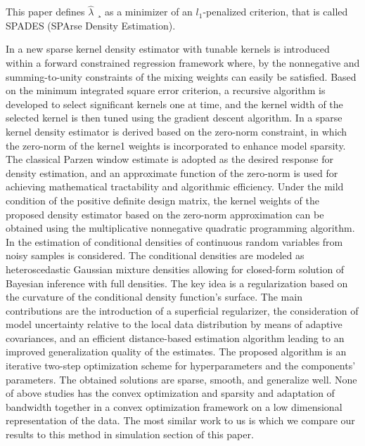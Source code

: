 This paper defines  $\hat{\lambda}$  ¸ as a minimizer of an $l_1$-penalized criterion, that is called SPADES (SPArse Density Estimation). \par
In \cite{hong2016sparse} a new sparse kernel density estimator with tunable kernels is introduced within a forward constrained regression framework where, by the nonnegative and summing-to-unity constraints of the mixing weights can easily be satisfied. Based on the minimum integrated square error criterion, a recursive algorithm is developed to select significant kernels one at time, and the kernel width of the selected kernel is then tuned using the gradient descent algorithm. In \cite{hong2010sparse} a sparse kernel density estimator is derived based on the zero-norm constraint, in which the zero-norm of the kerne1 weights is incorporated to enhance model sparsity. The classical Parzen window estimate is adopted as the desired response for density estimation, and an approximate function of the zero-norm is used for achieving mathematical tractability and algorithmic efficiency. Under the mild condition of the positive definite design matrix, the kernel weights of the proposed density estimator based on the zero-norm approximation can be obtained using the multiplicative nonnegative quadratic programming algorithm. In \cite{krauthausen2011sparse} the estimation of conditional densities of continuous random variables from noisy samples is considered. The conditional densities are modeled as heteroscedastic Gaussian mixture densities allowing for closed-form solution of Bayesian inference with full densities. The key idea is a regularization based on the curvature of the conditional density function’s surface. The main contributions are the introduction of a superficial regularizer, the consideration of model uncertainty relative to the local data distribution by means of adaptive covariances, and an efficient distance-based estimation algorithm leading to an improved generalization quality of the estimates. The proposed algorithm is an iterative two-step optimization scheme for hyperparameters and the components’ parameters. The obtained solutions are sparse, smooth, and generalize well.
None of above studies has the convex optimization and sparsity and adaptation of bandwidth together in a convex optimization framework on a low dimensional representation of the data. The most similar work to us is \cite{hong2016sparse} which we compare our results to this method in simulation section of this paper.